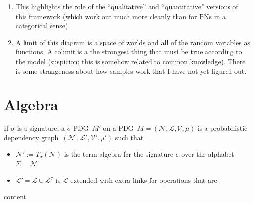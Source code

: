 \documentclass{article}
\newcommand\Set{\textbf{Set}}
\newcommand\bmu{\boldsymbol{\mu}}
\newcommand{\modelname}{probabilistic dependency graph}
\newcommand{\MN}{PDG}
\begin{document}
\begin{vcat}
\begin{enumerate}
\begin{proof}
			By the definition of $\bbr{M}_\Set$, we have $p(B = b \mid A = a) = q(B = b \mid A = a) = \bmu_{A,B}(a,b)$.  
			For brevity, we will use little letters ($a$) in place of events ($A = a$).
			Therefore, $p(a\land b) = \bmu_{A,B}(a,b) p(a)$ and $q(ab) = \bmu_{A,B}(a,b) q(a)$. Some algebra reveals:
			\begin{align*}
				&~ \Big( \alpha p + (1-\alpha) q \Big) (B = b \mid A = a)\\ &= 
				\frac{\Big( \alpha p + (1-\alpha) q \Big) (b \land a)}{\Big( \alpha p + (1-\alpha) q \Big) (a)} \\
				&= \frac{ \alpha p(b \land a) + (1-\alpha) q(b \land a) }{\Big( \alpha p(a) + (1-\alpha) q (a)} \\
				&= \frac{ \alpha \bmu_{A,B}(a,b) p(a) + (1-\alpha) \bmu_{A,B}(a,b) q(a) }{\Big( \alpha p(a) + (1-\alpha) q (a)} \\
				&=\bmu_{A,B}(a,b) \left(\frac{ \alpha  p(a) + (1-\alpha) q(a) }{\Big( \alpha p(a) + (1-\alpha) q (a)}\right)\\
				&= \bmu_{A,B}(a,b)
			\end{align*}
			and so the mixture $\Big(\alpha p + (1-\alpha) q \Big)$ is also contained in $\bbr{M}_\Set$.
		\end{proof}
			
			\item This highlights the role of the ``qualitative'' and ``quantitative'' versions of this framework (which work out much more cleanly than for BNs in a categorical sense)
			
			\item A limit of this diagram is a space of worlds and all of the random variables as functions. A colimit is a the strongest thing that must be true according to the model (suspicion: this is somehow related to common knowledge). There is some strangeness about how samples work that I have not yet figured out.
		\end{enumerate}


		\section{Algebra}\label{sec:algebra}
		\begin{defn}
			If $\sigma$ is a signature, a $\sigma$-\MN\ $M'$ on a \MN\ $M=(\mathcal N, \mathcal L, \mathcal V, \mu)$ is a \modelname\ $(\mathcal N', \mathcal L', \mathcal V', \mu')$ such that
			\begin{itemize}
				\item $\mathcal N':= T_\sigma(\mathcal N)$ is the term algebra for the signature $\sigma$ over the alphabet $\Sigma = \mathcal N$.
				\item $\mathcal L' = \mathcal L \cup \mathcal L^\sigma$ is $\mathcal L$ extended with extra links for operations that are 
			\end{itemize}
		\end{defn}
		
		\begin{example}
			content
		\end{example}		
	\end{vcat}
\end{document}
